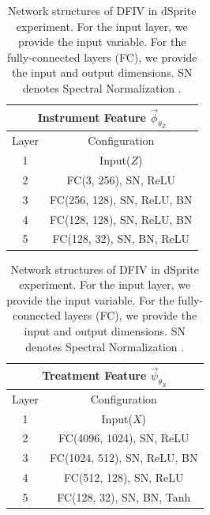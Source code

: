 \begingroup
\renewcommand{\arraystretch}{1.2}
\begin{table}[t]
    \caption{Network structures of DFIV in dSprite experiment. For the input layer, we provide the input variable. For the fully-connected layers (FC), we provide the input and output dimensions. SN denotes Spectral Normalization \citep{Miyato2018}.}
    
    \label{dfiv-dsprite}
    
    \begin{minipage}{0.48\hsize}
        \centering
        \begin{tabular}{cc}
            \multicolumn{2}{c}{\textbf{Instrument Feature} $\vec{\phi}_{\theta_Z}$ }
            \\ \hline
            Layer & Configuration \\ \hline
            1 & Input($Z$) \\ \hline
            2 & FC(3, 256), SN, ReLU\\ \hline
            3 & FC(256, 128), SN, ReLU, BN \\ \hline
            4 & FC(128, 128), SN, ReLU, BN \\ \hline
            5 & FC(128, 32), SN, BN, ReLU \\ \hline
            \end{tabular}    
    \end{minipage}
    \hfill
    \begin{minipage}{0.48\hsize}
        \centering
        \begin{tabular}{cc}
            \multicolumn{2}{c}{\textbf{Treatment Feature} $\vec{\psi}_{\theta_X}$} 
            \\ \hline
            Layer & Configuration \\ \hline
            1 & Input($X$) \\ \hline
            2 & FC(4096, 1024), SN, ReLU \\ \hline
            3 & FC(1024, 512), SN, ReLU, BN \\ \hline
            4 & FC(512, 128), SN,  ReLU \\ \hline
            5 & FC(128, 32), SN, BN, Tanh \\ \hline
            \end{tabular}    
    \end{minipage}
\end{table}
\endgroup  

